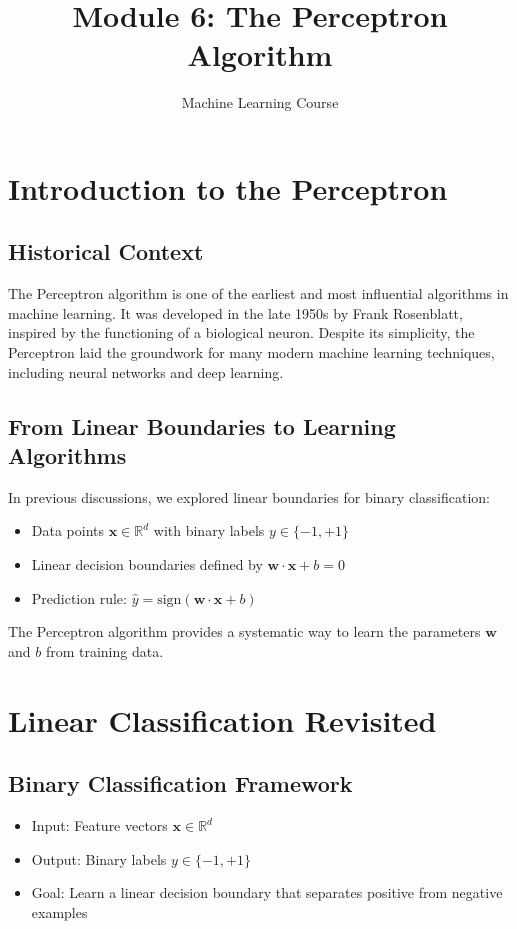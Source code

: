 \documentclass{article}
\title{Module 6: The Perceptron Algorithm}
\author{Machine Learning Course}
\date{}
\begin{document}
\maketitle
\tableofcontents
\newpage

\section{Introduction to the Perceptron}

\subsection{Historical Context}
The Perceptron algorithm is one of the earliest and most influential algorithms in machine learning. It was developed in the late 1950s by Frank Rosenblatt, inspired by the functioning of a biological neuron. Despite its simplicity, the Perceptron laid the groundwork for many modern machine learning techniques, including neural networks and deep learning.

\subsection{From Linear Boundaries to Learning Algorithms}
In previous discussions, we explored linear boundaries for binary classification:
\begin{itemize}
    \item Data points $\mathbf{x} \in \mathbb{R}^d$ with binary labels $y \in \{-1, +1\}$
    \item Linear decision boundaries defined by $\mathbf{w} \cdot \mathbf{x} + b = 0$
    \item Prediction rule: $\hat{y} = \text{sign}(\mathbf{w} \cdot \mathbf{x} + b)$
\end{itemize}

The Perceptron algorithm provides a systematic way to learn the parameters $\mathbf{w}$ and $b$ from training data.

\section{Linear Classification Revisited}

\subsection{Binary Classification Framework}
\begin{itemize}
    \item Input: Feature vectors $\mathbf{x} \in \mathbb{R}^d$
    \item Output: Binary labels $y \in \{-1, +1\}$
    \item Goal: Learn a linear decision boundary that separates positive from negative examples
\end{itemize}
\end{document}
